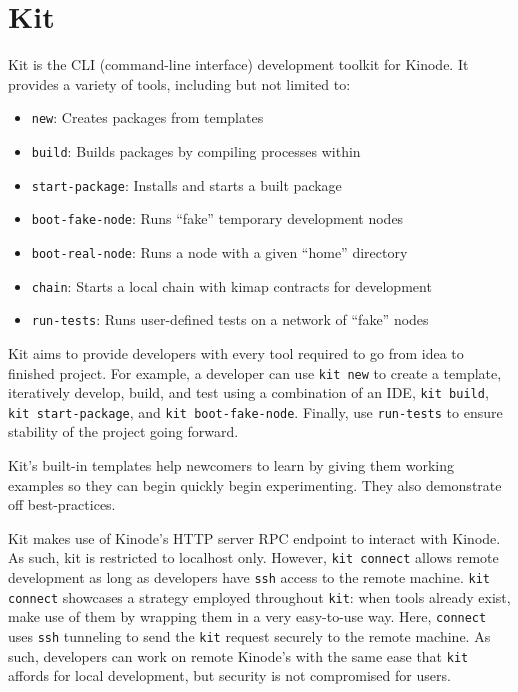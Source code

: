 \documentclass[runningheads]{llncs}
\begin{document}
\section{Kit}

Kit is the CLI (command-line interface) development toolkit for Kinode.
It provides a variety of tools, including but not limited to:
\begin{itemize}
	\item \verb|new|: Creates packages from templates
	\item \verb|build|: Builds packages by compiling processes within
	\item \verb|start-package|: Installs and starts a built package
	\item \verb|boot-fake-node|: Runs ``fake'' temporary development nodes
	\item \verb|boot-real-node|: Runs a node with a given ``home'' directory
	\item \verb|chain|: Starts a local chain with kimap contracts for development
	\item \verb|run-tests|: Runs user-defined tests on a network of ``fake'' nodes
\end{itemize}

Kit aims to provide developers with every tool required to go from idea to finished project.
For example, a developer can use \verb|kit new| to create a template, iteratively develop, build, and test using a combination of an IDE, \verb|kit build|, \verb|kit start-package|, and \verb|kit boot-fake-node|.
Finally, use \verb|run-tests| to ensure stability of the project going forward.

Kit's built-in templates help newcomers to learn by giving them working examples so they can begin quickly begin experimenting.
They also demonstrate off best-practices.

Kit makes use of Kinode's HTTP server RPC endpoint to interact with Kinode.
As such, kit is restricted to localhost only.
However, \verb|kit connect| allows remote development as long as developers have \verb|ssh| access to the remote machine.
\verb|kit connect| showcases a strategy employed throughout \verb|kit|: when tools already exist, make use of them by wrapping them in a very easy-to-use way.
Here, \verb|connect| uses \verb|ssh| tunneling to send the \verb|kit| request securely to the remote machine.
As such, developers can work on remote Kinode's with the same ease that \verb|kit| affords for local development, but security is not compromised for users.
\end{document}
